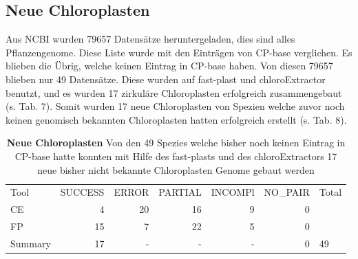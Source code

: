 \documentclass{scrartcl}
\begin{document}
\subsection{Neue Chloroplasten}
\label{sec-4-10}
Aus NCBI wurden 79657 Datensätze heruntergeladen, dies sind alles Pflanzengenome. Diese Liste wurde mit den Einträgen von CP-base verglichen. Es blieben die Übrig, welche keinen Eintrag in CP-base haben. 
Von diesen 79657 blieben nur 49 Datensätze. Diese wurden auf fast-plast und chloroExtractor benutzt, und es wurden 17 zirkuläre Chloroplasten erfolgreich zusammengebaut (s. Tab. 7). Somit wurden 17 neue Chloroplasten von Spezien
welche zuvor noch keinen genomisch bekannten Chloroplasten hatten erfolgreich erstellt (s. Tab. 8).
\begin{table}[!h]
\caption[Neue Chloroplasten]{\textbf{Neue Chloroplasten} Von den 49 Spezies welche bisher noch keinen Eintrag in CP-base hatte konnten mit Hilfe des fast-plasts und des chloroExtractors 17 neue bisher nicht bekannte Chloroplasten Genome gebaut werden}
\begin{center}
\begin{tabular}{lrrrrrl}
Tool & SUCCESS & ERROR & PARTIAL & INCOMPl & NO\_PAIR & Total\\
CE & 4 & 20 & 16 & 9 & 0 & \\
FP & 15 & 7 & 22 & 5 & 0 & \\
Summary & 17 & - & - & - & 0 & 49\\
\end{tabular}
\end{center}
\end{table}
\end{document}
